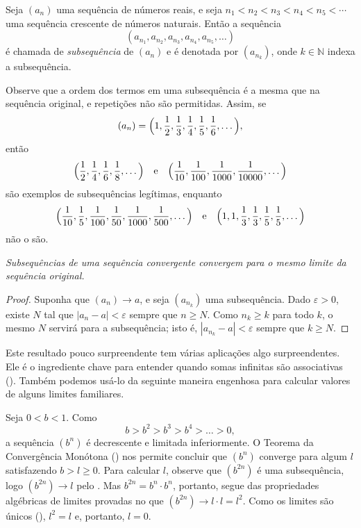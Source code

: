 \begin{definition}\label{def:subsequencia}
Seja $(a_n)$ uma sequência de números reais, e seja $n_1 < n_2 < n_3 < n_4 < n_5 < \cdots$ uma sequência crescente de números naturais. Então a sequência
\[
(a_{n_1}, a_{n_2}, a_{n_3}, a_{n_4}, a_{n_5}, \dots)
\]
é chamada de \textit{subsequência} de $(a_n)$ e é denotada por $(a_{n_k})$, onde $k \in \mathbb{N}$ indexa a subsequência. 
\end{definition}

Observe que a ordem dos termos em uma subsequência é a mesma que na sequência original, e repetições não são permitidas. Assim, se
\[
(a_n) = \Bigl(1, \frac12, \frac13, \frac14, \frac15, \frac16, \dots \Bigr),
\]
então
\[
\Bigl( \frac12, \frac14, \frac16, \frac18, \dots \Bigr)
\quad\text{e}\quad
\Bigl( \frac{1}{10}, \frac{1}{100}, \frac{1}{1000}, \frac{1}{10000}, \dots \Bigr)
\]
são exemplos de subsequências legítimas, enquanto
\[
\Bigl( \frac{1}{10}, \frac15, \frac{1}{100}, \frac{1}{50}, \frac{1}{1000}, \frac{1}{500}, \dots \Bigr)
\quad\text{e}\quad
\Bigl( 1, 1, \frac13, \frac13, \frac15, \frac15, \dots \Bigr)
\]
não o são.

\begin{theorem}\label{thm:subsequencias-convergentes}
\textit{Subsequências de uma sequência convergente convergem para o mesmo limite da sequência original.}
\end{theorem}

\begin{proof}
Suponha que $(a_n) \to a$, e seja $(a_{n_k})$ uma subsequência. Dado $\varepsilon > 0$, existe $N$ tal que $|a_n - a| < \varepsilon$ sempre que $n \geq N$. Como $n_k \geq k$ para todo $k$, o mesmo $N$ servirá para a subsequência; isto é, $|a_{n_k} - a| < \varepsilon$ sempre que $k \geq N$.
\end{proof}

Este resultado pouco surpreendente tem várias aplicações algo surpreendentes. Ele é o ingrediente chave para entender quando somas infinitas são associativas (). Também podemos usá-lo da seguinte maneira engenhosa para calcular valores de alguns limites familiares.

\begin{example}\label{exmpl:2-5-3}
Seja $0 < b < 1$. Como
\[
b > b^2 > b^3 > b^4 > \dots > 0,
\]
a sequência $(b^n)$ é decrescente e limitada inferiormente. O Teorema da Convergência Monótona () nos permite concluir que $(b^n)$ converge para algum $l$ satisfazendo $b > l \geq 0$. Para calcular $l$, observe que $(b^{2n})$ é uma subsequência, logo $(b^{2n}) \to l$ pelo . Mas $b^{2n} = b^n \cdot b^n$, portanto, 
segue das propriedades algébricas de limites provadas no   
 que $(b^{2n}) \to l \cdot l = l^2$. Como os limites são únicos (), $l^2 = l$ e, portanto, $l = 0$.
\end{example}

